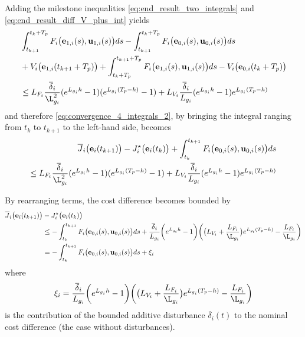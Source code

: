 Adding the milestone inequalities \eqref{eq:end_result_two_integrals} and
\eqref{eq:end_result_diff_V_plus_int} yields
\begin{alignat}{2}
  &\int_{t_{k+1}}^{t_k + T_p} F_i \big(\vect{e}_{1,i}(s), \vect{u}_{1,i} (s)\big) d s
  - \int_{t_{k+1}}^{t_k + T_p} F_i \big(\vect{e}_{0,i}(s), \vect{u}_{0,i} (s)\big) d s \\
  &+ V_i\big(\vect{e}_{1,i}(t_{k+1} + T_p)\big)
  + \int_{t_k + T_p}^{t_{k+1} + T_p} F_i\big(\vect{e}_{1,i}(s), \vect{u}_{1,i}(s)\big) ds
  - V_i\big(\vect{e}_{0,i}(t_k + T_p)\big) \\
  &\leq L_{F_i} \dfrac{\overline{\delta}_i}{\L_{g_i}^2} (e^{L_{g_i} h} - 1) (e^{L_{g_i}(T_p-h)} - 1)
  + L_{V_i}\dfrac{\overline{\delta}_i}{L_{g_i}} (e^{L_{g_i}h} - 1) e^{L_{g_i} (T_p - h)}
\end{alignat}
and therefore \eqref{eq:convergence_4_integrals_2}, by bringing the integral
ranging from $t_k$ to $t_{k+1}$ to the left-hand side, becomes
\begin{align}
  \overline{J}_i\big(\vect{e}_i(t_{k+1})\big)
    - J_i^{\star}\big(\vect{e}_i(t_k)\big)
    + \int_{t_k}^{t_{k+1}} F_i \big(\vect{e}_{0,i}(s), \vect{u}_{0,i} (s)\big) d s \\
    \leq L_{F_i} \dfrac{\overline{\delta}_i}{\L_{g_i}^2} (e^{L_{g_i} h} - 1) (e^{L_{g_i}(T_p-h)} - 1)
  + L_{V_i}\dfrac{\overline{\delta}_i}{L_{g_i}} (e^{L_{g_i}h} - 1) e^{L_{g_i} (T_p - h)}
\end{align}

By rearranging terms, the cost difference becomes bounded by
\begin{align}
  \overline{J}_i\big(\vect{e}_i(t_{k+1})\big) &- J_i^{\star}\big(\vect{e}_i(t_k)\big) \\
  &\leq -\int_{t_k}^{t_{k+1}} F_i \big(\vect{e}_{0,i}(s), \vect{u}_{0,i} (s)\big) d s
    + \dfrac{\overline{\delta}_i}{L_{g_i}} \bigg(e^{L_{g_i}h} - 1\bigg)
    \bigg(\big(L_{V_i} + \dfrac{L_{F_i}}{\L_{g_i}}\big) e^{L_{g_i}(T_p-h)}  - \dfrac{L_{F_i}}{\L_{g_i}}\bigg) \\
  &= -\int_{t_k}^{t_{k+1}} F_i \big(\vect{e}_{0,i}(s), \vect{u}_{0,i} (s)\big) d s + \xi_i
\end{align}
where
\begin{align}
  \xi_i = \dfrac{\overline{\delta}_i}{L_{g_i}} \bigg(e^{L_{g_i}h} - 1\bigg)
    \bigg(\big(L_{V_i} + \dfrac{L_{F_i}}{\L_{g_i}}\big) e^{L_{g_i}(T_p-h)}  - \dfrac{L_{F_i}}{\L_{g_i}}\bigg)
\end{align}
is the contribution of the bounded additive disturbance $\overline{\delta}_i(t)$
to the nominal cost difference (the case without disturbances).

